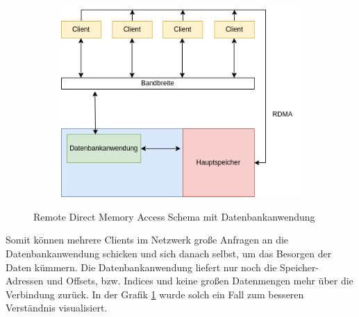 \begin{figure}[h]
  \centering
  \begin{subfigure}[b]{0.5\textwidth}
    \includegraphics[width=1.0\linewidth]{img/rdma}
  \end{subfigure}
  \caption{Remote Direct Memory Access Schema mit Datenbankanwendung}
  \label{graf6}
\end{figure}

Somit können mehrere Clients im Netzwerk große Anfragen an die Datenbankanwendung schicken und sich danach selbst, um das Besorgen der Daten kümmern. Die Datenbankanwendung liefert nur noch die Speicher-Adressen und Offsets, bzw. Indices und keine großen Datenmengen mehr über die Verbindung zurück. In der Grafik \ref{graf6} wurde solch ein Fall zum besseren Verständnis visualisiert.








